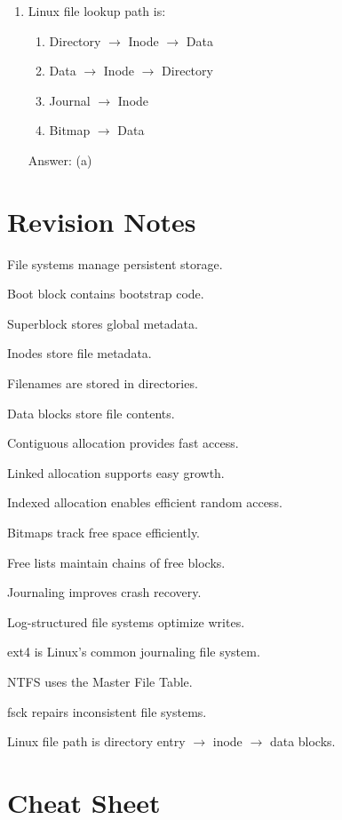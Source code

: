 \begin{enumerate}
\item Linux file lookup path is:
\begin{enumerate}[label=(\alph*)]
\item Directory $\rightarrow$ Inode $\rightarrow$ Data
\item Data $\rightarrow$ Inode $\rightarrow$ Directory
\item Journal $\rightarrow$ Inode
\item Bitmap $\rightarrow$ Data
\end{enumerate}
Answer: (a)
\end{enumerate}

\section{Revision Notes}

\begin{revisionnotes}
\item File systems manage persistent storage.
\item Boot block contains bootstrap code.
\item Superblock stores global metadata.
\item Inodes store file metadata.
\item Filenames are stored in directories.
\item Data blocks store file contents.
\item Contiguous allocation provides fast access.
\item Linked allocation supports easy growth.
\item Indexed allocation enables efficient random access.
\item Bitmaps track free space efficiently.
\item Free lists maintain chains of free blocks.
\item Journaling improves crash recovery.
\item Log-structured file systems optimize writes.
\item ext4 is Linux's common journaling file system.
\item NTFS uses the Master File Table.
\item fsck repairs inconsistent file systems.
\item Linux file path is directory entry $\rightarrow$ inode $\rightarrow$ data blocks.
\end{revisionnotes}

\section{Cheat Sheet}

